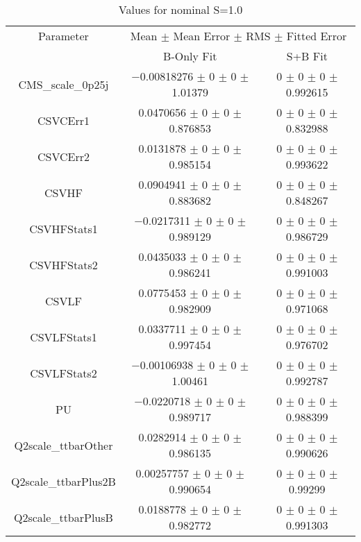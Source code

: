 \begin{table}
\centering
\caption{Values for nominal S=1.0}
\begin{tabular}{ccc}
\toprule
Parameter & \multicolumn{2}{c}{Mean $\pm$ Mean Error $\pm$ RMS $\pm$ Fitted Error}\\
 & B-Only Fit & S+B Fit\\
\midrule
CMS\_scale\_0p25j & \num{-0.00818276} $\pm$ \num{0} $\pm$ \num{0} $\pm$ \num{1.01379} & \num{0} $\pm$ \num{0} $\pm$ \num{0} $\pm$ \num{0.992615}\\
CSVCErr1 & \num{0.0470656} $\pm$ \num{0} $\pm$ \num{0} $\pm$ \num{0.876853} & \num{0} $\pm$ \num{0} $\pm$ \num{0} $\pm$ \num{0.832988}\\
CSVCErr2 & \num{0.0131878} $\pm$ \num{0} $\pm$ \num{0} $\pm$ \num{0.985154} & \num{0} $\pm$ \num{0} $\pm$ \num{0} $\pm$ \num{0.993622}\\
CSVHF & \num{0.0904941} $\pm$ \num{0} $\pm$ \num{0} $\pm$ \num{0.883682} & \num{0} $\pm$ \num{0} $\pm$ \num{0} $\pm$ \num{0.848267}\\
CSVHFStats1 & \num{-0.0217311} $\pm$ \num{0} $\pm$ \num{0} $\pm$ \num{0.989129} & \num{0} $\pm$ \num{0} $\pm$ \num{0} $\pm$ \num{0.986729}\\
CSVHFStats2 & \num{0.0435033} $\pm$ \num{0} $\pm$ \num{0} $\pm$ \num{0.986241} & \num{0} $\pm$ \num{0} $\pm$ \num{0} $\pm$ \num{0.991003}\\
CSVLF & \num{0.0775453} $\pm$ \num{0} $\pm$ \num{0} $\pm$ \num{0.982909} & \num{0} $\pm$ \num{0} $\pm$ \num{0} $\pm$ \num{0.971068}\\
CSVLFStats1 & \num{0.0337711} $\pm$ \num{0} $\pm$ \num{0} $\pm$ \num{0.997454} & \num{0} $\pm$ \num{0} $\pm$ \num{0} $\pm$ \num{0.976702}\\
CSVLFStats2 & \num{-0.00106938} $\pm$ \num{0} $\pm$ \num{0} $\pm$ \num{1.00461} & \num{0} $\pm$ \num{0} $\pm$ \num{0} $\pm$ \num{0.992787}\\
PU & \num{-0.0220718} $\pm$ \num{0} $\pm$ \num{0} $\pm$ \num{0.989717} & \num{0} $\pm$ \num{0} $\pm$ \num{0} $\pm$ \num{0.988399}\\
Q2scale\_ttbarOther & \num{0.0282914} $\pm$ \num{0} $\pm$ \num{0} $\pm$ \num{0.986135} & \num{0} $\pm$ \num{0} $\pm$ \num{0} $\pm$ \num{0.990626}\\
Q2scale\_ttbarPlus2B & \num{0.00257757} $\pm$ \num{0} $\pm$ \num{0} $\pm$ \num{0.990654} & \num{0} $\pm$ \num{0} $\pm$ \num{0} $\pm$ \num{0.99299}\\
Q2scale\_ttbarPlusB & \num{0.0188778} $\pm$ \num{0} $\pm$ \num{0} $\pm$ \num{0.982772} & \num{0} $\pm$ \num{0} $\pm$ \num{0} $\pm$ \num{0.991303}\\

\end{tabular}
\end{table}
